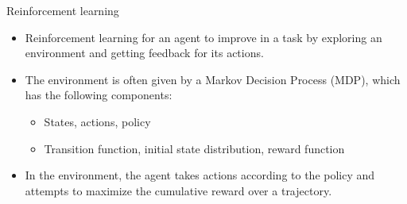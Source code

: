 \documentclass[normaltitle,first=orange,second=red,leqno]{aaltoslides}
\begin{document}
\begin{frame}{Reinforcement learning}
    \begin{itemize}
        \item<1-> Reinforcement learning for an agent to improve in a task by exploring an environment and getting feedback for its actions.
        \item<2-> The environment is often given by a Markov Decision Process (MDP), which has the following components:
        \begin{itemize}
            \item States, actions, policy
            \item Transition function, initial state distribution, reward function
        \end{itemize}
        \item<3-> In the environment, the agent takes actions according to the policy and attempts to maximize the cumulative reward over a trajectory.
    \end{itemize}
\end{frame}


\end{document}
